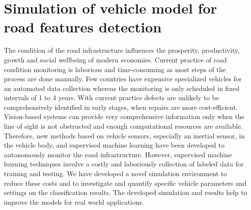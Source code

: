 

\thispagestyle{empty}
\section*{Simulation of vehicle model for road features detection}


The condition of the road infrastructure influences the prosperity, productivity, growth and social wellbeing of modern economies.
%
Current practice of road condition monitoring is laborious and time-consuming as most steps of the process are done manually.
%
Few countries have expensive specialized vehicles for an automated data collection whereas the monitoring is only scheduled in fixed intervals of 1 to 4 years.
%
With current practice defects are unlikely to be comprehensively identified in early stages, when repairs are more cost-efficient.
%
Vision-based systems can provide very comprehensive information only when the line of sight is not obstructed and enough computational resources are available.
%
Therefore, new methods based on vehicle sensors, especially an inertial sensor, in the vehicle body, and supervised machine learning have been developed to autonomously monitor the road infrastructure.
%
However, supervised machine learning techniques involve a costly and laboriously collection of labeled data for training and testing.
%
We have developed a novel simulation environment to reduce these costs and to investigate and quantify specific vehicle parameters and settings on the classification results.
%
The developed simulation and results help to improve the models for real world applications.
